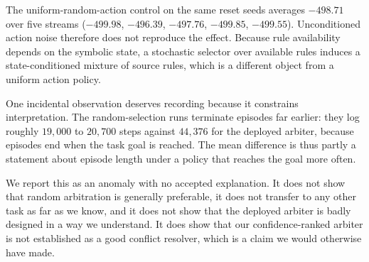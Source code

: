 \documentclass[11pt,a4paper]{article}
\begin{document}
The uniform-random-action control on the same reset seeds averages $-498.71$ over five streams ($-499.98$, $-496.39$, $-497.76$, $-499.85$, $-499.55$). Unconditioned action noise therefore does not reproduce the effect. Because rule availability depends on the symbolic state, a stochastic selector over available rules induces a state-conditioned mixture of source rules, which is a different object from a uniform action policy.

One incidental observation deserves recording because it constrains interpretation. The random-selection runs terminate episodes far earlier: they log roughly $19{,}000$ to $20{,}700$ steps against $44{,}376$ for the deployed arbiter, because episodes end when the task goal is reached. The mean difference is thus partly a statement about episode length under a policy that reaches the goal more often.

We report this as an anomaly with no accepted explanation. It does not show that random arbitration is generally preferable, it does not transfer to any other task as far as we know, and it does not show that the deployed arbiter is badly designed in a way we understand. It does show that our confidence-ranked arbiter is not established as a good conflict resolver, which is a claim we would otherwise have made.
\end{document}
